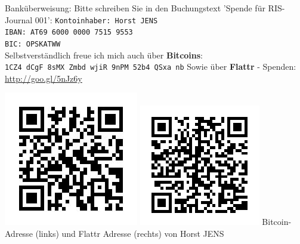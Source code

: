 Banküberweisung: Bitte schreiben Sie in den Buchungstext 'Spende für RIS-Journal 001':
\texttt{Kontoinhaber: Horst JENS \\
IBAN: AT69 6000 0000 7515 9553\\
BIC: OPSKATWW} \\
Selbstverständlich freue ich mich auch über \textbf{Bitcoins}:\\
\texttt{1CZ4 dCgF 8sMX Zmbd wjiR 9nPM 52b4 QSxa nb}
Sowie über \textbf{Flattr} - Spenden: \url{http://goo.gl/5nJz6y}
\begin{center}
\includegraphics[width=0.49\linewidth]{editoral/editoral-bitcoin-qr.jpg} 
\includegraphics[width=0.49\linewidth]{editoral/editoral-flattr-qr.png}
\footnotesize{Bitcoin-Adresse (links) und Flattr Adresse (rechts) von Horst JENS}
\end{center}


